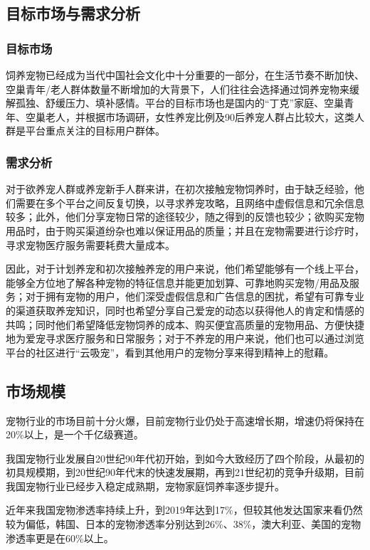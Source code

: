 \documentclass[a4paper]{ctexart}
\begin{document}
\subsection{目标市场与需求分析}

\subsubsection{目标市场}

饲养宠物已经成为当代中国社会文化中十分重要的一部分，在生活节奏不断加快、空巢青年/老人群体数量不断增加的大背景下，人们往往会选择通过饲养宠物来缓解孤独、舒缓压力、填补感情。平台的目标市场也是国内的“丁克”家庭、空巢青年、空巢老人，并根据市场调研，女性养宠比例及90后养宠人群占比较大，这类人群是平台重点关注的目标用户群体。

\subsubsection{需求分析}

对于欲养宠人群或养宠新手人群来讲，在初次接触宠物饲养时，由于缺乏经验，他们需要在多个平台之间反复切换，以寻求养宠攻略，且网络中虚假信息和冗余信息较多；此外，他们分享宠物日常的途径较少，随之得到的反馈也较少；欲购买宠物用品时，由于购买渠道纷杂也难以保证用品的质量；并且在宠物需要进行诊疗时，寻求宠物医疗服务需要耗费大量成本。

因此，对于计划养宠和初次接触养宠的用户来说，他们希望能够有一个线上平台，能够全方位地了解各种宠物的特征信息并能更加划算、可靠地购买宠物/用品及服务；对于拥有宠物的用户，他们深受虚假信息和广告信息的困扰，希望有可靠专业的渠道获取养宠知识，同时也希望分享自己爱宠的动态以获得他人的肯定和情感的共鸣；同时他们希望降低宠物饲养的成本、购买便宜高质量的宠物用品、方便快捷地为爱宠寻求医疗服务和日常服务；对于不养宠的用户来说，他们也可以通过浏览平台的社区进行“云吸宠”，看到其他用户的宠物分享来得到精神上的慰藉。

\subsection{市场规模}
宠物行业的市场目前十分火爆，目前宠物行业仍处于高速增长期，增速仍将保持在20\%以上，是一个千亿级赛道。

我国宠物行业发展自20世纪90年代初开始，到如今大致经历了四个阶段，从最初的初具规模期，到20世纪90年代末的快速发展期，再到21世纪初的竞争升级期，目前我国宠物行业已经步入稳定成熟期，宠物家庭饲养率逐步提升。

近年来我国宠物渗透率持续上升，到2019年达到17\%，但较其他发达国家来看仍然较为偏低，韩国、日本的宠物渗透率分别达到26\%、38\%，澳大利亚、美国的宠物渗透率更是在60\%以上。
\end{document}

